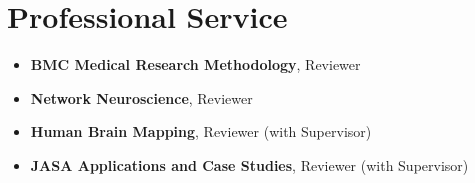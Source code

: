 \documentclass[letterpaper,11pt]{article}
\newenvironment{cvlist}
  {\begin{itemize}[leftmargin=0.15in, label={}, itemsep=2pt, parsep=0pt, topsep=2pt]\small}
  {\end{itemize}}
\begin{document}
\section{Professional Service}
\begin{cvlist}
\item \textbf{BMC Medical Research Methodology}, Reviewer
\item \textbf{Network Neuroscience}, Reviewer
\item \textbf{Human Brain Mapping}, Reviewer (with Supervisor)
\item \textbf{JASA Applications and Case Studies}, Reviewer (with Supervisor)
\end{cvlist}
\end{document}
